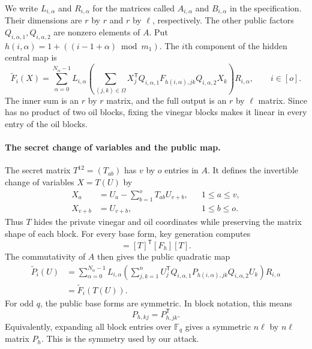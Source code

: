 \documentclass[11pt]{article}
\newcommand{\F}{\mathbb F}
\newcommand{\transpose}{\mathsf T}
\begin{document}
We write $L_{i,\alpha}$ and $R_{i,\alpha}$ for the matrices called
$A_{i,\alpha}$ and $B_{i,\alpha}$ in the specification.  Their dimensions are
$r$ by $r$ and $r$ by $\ell$, respectively.  The other public factors
$Q_{i,\alpha,1},Q_{i,\alpha,2}$ are nonzero elements of $A$.  Put
$h(i,\alpha)=1+((i-1+\alpha)\bmod m_1)$.  The $i$th component of the hidden
central map is
\begin{equation}
 \widetilde F_i(X)=
 \sum_{\alpha=0}^{N_\alpha-1} L_{i,\alpha}
 \left(
   \sum_{(j,k)\in\Omega}
   X_j^\transpose
   Q_{i,\alpha,1}F_{h(i,\alpha),jk}Q_{i,\alpha,2}X_k
 \right)R_{i,\alpha},
 \qquad i\in[o].
 \label{eq:scheme-central}
\end{equation}
The inner sum is an $r$ by $r$ matrix, and the full output is an $r$ by
$\ell$ matrix.  Since  has no product of two oil
blocks, fixing the vinegar blocks makes it linear in every entry of the oil
blocks.

\paragraph{The secret change of variables and the public map.}
The secret matrix $T^{12}=(T_{ab})$ has $v$ by $o$ entries in $A$.  It defines
the invertible change of variables $X=T(U)$ by
\begin{equation}
 \begin{aligned}
  X_a&=U_a-\sum_{b=1}^o T_{ab}U_{v+b}, &&1\le a\le v,\\
  X_{v+b}&=U_{v+b}, &&1\le b\le o.
 \end{aligned}
 \label{eq:scheme-secret-change}
\end{equation}
Thus $T$ hides the private vinegar and oil coordinates while preserving the
matrix shape of each block.  For every base form, key generation computes
\begin{equation}
 [P_h]=[T]^\transpose[F_h][T].
 \label{eq:scheme-base-public}
\end{equation}
The commutativity of $A$ then gives the public quadratic map
\begin{equation}
 \begin{split}
 \widetilde P_i(U)
 &=\sum_{\alpha=0}^{N_\alpha-1} L_{i,\alpha}
 \left(
   \sum_{j,k=1}^n
   U_j^\transpose
   Q_{i,\alpha,1}P_{h(i,\alpha),jk}Q_{i,\alpha,2}U_k
 \right)R_{i,\alpha}\\
 &=\widetilde F_i(T(U)).
 \end{split}
 \label{eq:scheme-public-map}
\end{equation}
For odd $q$, the public base forms are symmetric.  In block notation, this
means
\begin{equation}
 P_{h,kj}=P_{h,jk}^\transpose.
 \label{eq:scheme-public-symmetry}
\end{equation}
Equivalently, expanding all block entries over $\F_q$ gives a symmetric
$n\ell$ by $n\ell$ matrix $P_h$.  This is the symmetry used by our attack.
\end{document}
